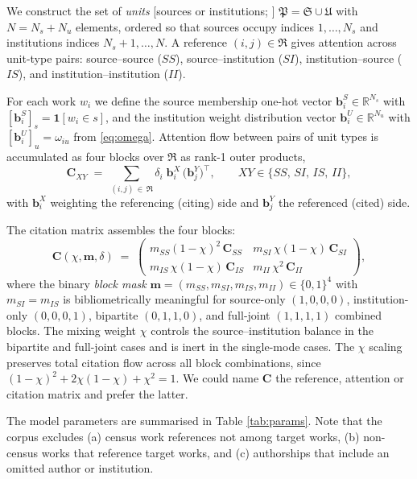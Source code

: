 We construct the set of \emph{units} [sources or institutions; \cite{pinskiCitationInfluenceJournal1976}]
$\mathfrak{P}=\mathfrak{S}\cup\mathfrak{U}$ with $N=N_s+N_u$ elements, ordered so that
sources occupy indices $1,\dots,N_s$ and institutions indices $N_s+1,\dots,N$.
A reference $(i,j) \in \mathfrak{R}$ gives attention across unit-type pairs:
source--source ($SS$), source--institution ($SI$), institution--source ($IS$), and
institution--institution ($II$).

For each work $w_i$ we define the source membership one-hot vector
$\mathbf{b}^S_i\in\mathbb{R}^{N_s}$ with $[\mathbf{b}^S_i]_s=\mathbf{1}[w_i\in s]$,
and the institution weight distribution vector
$\mathbf{b}^U_i\in\mathbb{R}^{N_u}$ with $[\mathbf{b}^U_i]_u=\omega_{iu}$
from \eqref{eq:omega}.
Attention flow between pairs of unit types is accumulated as four blocks over $\mathfrak{R}$ as rank-1 outer products,
\begin{equation}
	\mathbf{C}_{XY} \;=\; \sum_{(i,j)\,\in\,\mathfrak{R}}
	\delta_i\;\mathbf{b}^X_i\,\bigl(\mathbf{b}^Y_j\bigr)^\top,
	\qquad XY\in\{SS,\,SI,\,IS,\,II\},
	\label{eq:Cblock}
\end{equation}
with $\mathbf{b}^X_i$ weighting the referencing (citing) side and $\mathbf{b}^Y_j$ the referenced (cited) side.

The citation matrix assembles the four blocks:
\begin{equation}
	\mathbf{C}(\chi,\mathbf{m},\delta) \;=\;
	\begin{pmatrix}
		m_{SS}(1-\chi)^2\,\mathbf{C}_{SS} &
		m_{SI}\,\chi(1-\chi)\,\mathbf{C}_{SI} \\[4pt]
		m_{IS}\,\chi(1-\chi)\,\mathbf{C}_{IS} &
		m_{II}\,\chi^2\,\mathbf{C}_{II}
	\end{pmatrix},
	\label{eq:C}
\end{equation}
where the binary \textit{block mask} $\mathbf{m}=(m_{SS},m_{SI},m_{IS},m_{II})\in\{0,1\}^4$
with $m_{SI}=m_{IS}$ is bibliometrically meaningful for
source-only $(1,0,0,0)$, institution-only $(0,0,0,1)$,
bipartite $(0,1,1,0)$, and full-joint $(1,1,1,1)$ combined blocks.
The mixing weight $\chi$ controls the source--institution balance
in the bipartite and full-joint cases and is inert in the single-mode cases.
The $\chi$ scaling preserves total citation flow across all block combinations,
since $(1-\chi)^2+2\chi(1-\chi)+\chi^2=1$.
We could name $\mathbf{C}$ the reference, attention or citation matrix and prefer the latter.

The model parameters are summarised in Table \ref{tab:params}. Note that the corpus excludes (a) census work references not among target works, (b) non-census works that reference target works, and (c) authorships that include an omitted author or institution.

